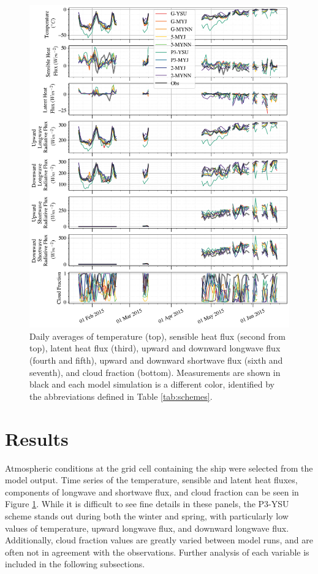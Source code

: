 \begin{figure}[p!]
    \centering
        \vspace*{-1cm}
    \includegraphics[width=1\linewidth]{figures/chapter3/WRF_totaltimeseries.png}
    \caption[Polar WRF simulated temperature, pressure, sensible and latent heat flux, components of longwave and shortwave flux, and cloud fraction time series.]{Daily averages of temperature (top), sensible heat flux (second from top), latent heat flux (third), upward and downward longwave flux (fourth and fifth), upward and downward shortwave flux (sixth and seventh), and cloud fraction (bottom). Measurements are shown in black and each model simulation is a different color, identified by the abbreviations defined in Table \ref{tab:schemes}.}
    \label{fig:wrf_all}
\end{figure}

\section{Results}
Atmospheric conditions at the grid cell containing the ship were selected from the model output. Time series of the temperature, sensible and latent heat fluxes, components of longwave and shortwave flux, and cloud fraction can be seen in Figure \ref{fig:wrf_all}. While it is difficult to see fine details in these panels, the P3-YSU scheme stands out during both the winter and spring, with particularly low values of temperature, upward longwave flux, and downward longwave flux. Additionally, cloud fraction values are greatly varied between model runs, and are often not in agreement with the observations. Further analysis of each variable is included in the following subsections.

